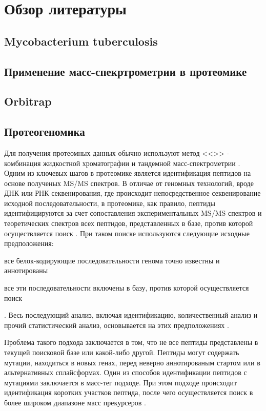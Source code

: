 \section{Обзор литературы}

\subsection{Mycobacterium tuberculosis}

\subsection{Применение масс-спекртрометрии в протеомике}

\subsection{Orbitrap}

\subsection{Протеогеномика}
Для получения протеомных данных обычно используют метод <<>> - комбинация жидкостной хроматографии и тандемной масс-спектрометрии \cite{bantscheff2012quantitative}. Одним из ключевых шагов в протеомике является идентификация пептидов на основе полученых MS/MS спектров. В отличае от геномных технологий, вроде ДНК или РНК секвенирования, где происходит непосредственное секвенирование исходной последовательности, в протеомике, как правило, пептиды идентифицируются за счет сопоставления экспериментальных MS/MS спектров и теоретических спектров всех пептидов, представленных в базе, против которой осуществляется поиск \cite{nesvizhskii2010survey}.
При таком поиске используются следующие исходные предположения: 
\begin{inparaenum}
    \item все белок-кодирующие последовательности генома точно известны и аннотированы
    \item все эти последовательности включены в базу, против которой осуществляется поиск
\end{inparaenum}.
Весь последующий анализ, включая идентификацию, количественный анализ и прочий статистический анализ, основывается на этих предположениях \cite{nesvizhskii2005interpretation}.

Проблема такого подхода заключается в том, что не все пептиды представлены в текущей поисковой базе или какой-либо другой. Пептиды могут содержать мутации, находиться в новых генах, перед неверно аннотированым стартом или в альтернативных сплайсформах. 
Один из способов идентификации пептидов с мутациями заключается в масс-тег подходе. При этом подходе происходит идентификация коротких участков пептида, после чего осуществляется поиск в более широком диапазоне масс прекурсеров \cite{dasari2010tagrecon}. 

